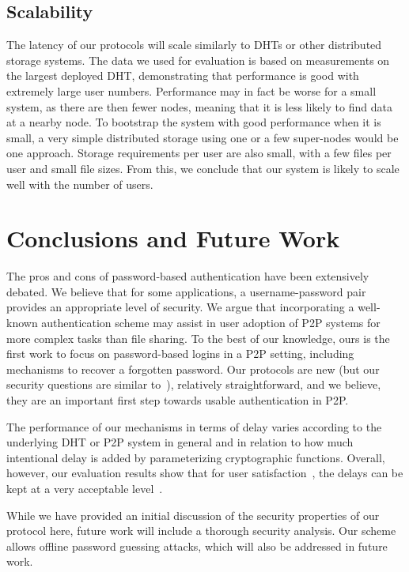 \subsection{Scalability}

The latency of our protocols will scale similarly to DHTs or other distributed
storage systems. The data we used for evaluation is based on measurements on
the largest deployed DHT, demonstrating that performance is good with
extremely large user numbers. Performance may in fact be worse for a small
system, as there are then fewer nodes, meaning that it is less likely to find
data at a nearby node. To bootstrap the system with good performance when it
is small, a very simple distributed storage using one or a few super-nodes
would be one approach. Storage requirements per user are also small, with a
few files per user and small file sizes. From this, we conclude that our
system is likely to scale well with the number of users.

\section{Conclusions and Future Work} 

The pros and cons of password-based authentication have been extensively
debated. We believe that for some applications, a username-password pair
provides an appropriate level of security. We argue that incorporating a
well-known authentication scheme may assist in user adoption of P2P systems
for more complex tasks than file sharing. To the best of our knowledge, ours
is the first work to focus on password-based logins in a P2P setting,
including mechanisms to recover a forgotten password. Our protocols are new
(but our security questions are similar to~\cite{FrykholmJ01}), relatively
straightforward, and we believe, they are an important first step towards
usable authentication in P2P. 

The performance of our mechanisms in terms of delay varies according
to the underlying DHT or P2P system in general and in relation to how
much intentional delay is added by parameterizing cryptographic
functions. Overall, however, our evaluation results show that for user
satisfaction~\cite{Rushinek86}, the delays can be kept at a very
acceptable level~\cite{ToliaAS06}.

While we have provided an initial discussion of the
security properties of our protocol here, future work will include a thorough
security analysis. Our scheme allows offline password guessing attacks, which
will also be addressed in future work.

